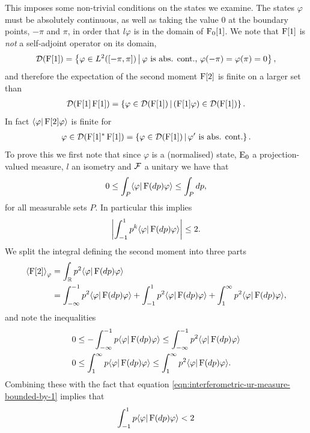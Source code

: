 This imposes some non-trivial conditions on the states we examine. The states $\varphi$ must be absolutely continuous, as well as taking the value $0$ at the boundary points, $-\pi$ and $\pi$, in order that $l\varphi$ is in the domain of $\operatorname{F}_0[1]$. We note that $\operatorname{F}[1]$ is \emph{not} a self-adjoint operator on its domain,
\begin{align}
  \mathcal{D}(\operatorname{F}[1]) = \left\{\varphi\in L^2([-\pi,\pi])\, \middle|\, \varphi \text{ is abs. cont., } \varphi(-\pi) = \varphi(\pi) = 0\right\},
\end{align}
and therefore the expectation of the second moment $\operatorname{F}[2]$ is finite on a larger set than 
\begin{align}\label{eqn:bad-opf[2]-domain}
  \mathcal{D}(\operatorname{F}[1]\operatorname{F}[1]) = \left\{\varphi\in\mathcal{D}(\operatorname{F}[1])\,\middle|\,\left(\operatorname{F}[1]\varphi\right)\in\mathcal{D}(\operatorname{F}[1])\right\}.
\end{align}
In fact $\langle \varphi|\operatorname{F}[2]\varphi\rangle$ is finite for
\begin{align}\label{eqn:good-opf[2]-domain}
  \varphi\in\mathcal{D}(\operatorname{F}[1]^*\operatorname{F}[1]) = \left\{\varphi\in\mathcal{D}(\operatorname{F}[1])\,\middle|\,\varphi^\prime \text{ is abs. cont.}\right\}.
\end{align}
To prove this we first note that since $\varphi$ is a (normalised) state, $\operatorname{E}_0$ a projection-valued measure, $l$ an isometry and $\mathcal{F}$ a unitary we have that 
\begin{align}\label{eqn:interferometric-ur-measure-bounded-by-1}
  0\leq\int_P \langle \varphi|\operatorname{F}(dp)\varphi\rangle \leq \int_P dp,
\end{align}
for all measurable sets $P$. In particular this implies
\begin{align}
   {\left\lvert{\int_{-1}^1 p^k \langle \varphi|\operatorname{F}(dp)\varphi\rangle }\right\rvert} \leq 2.
\end{align}
We split the integral defining the second moment into three parts
\begin{align}
  \left\langle{\operatorname{F}[2]}\right\rangle_{\varphi} &= \int_{\mathbb{R}} p^2 \langle \varphi|\operatorname{F}(dp)\varphi\rangle\\
                          &= \int_{-\infty}^{-1} p^2 \langle \varphi|\operatorname{F}(dp)\varphi\rangle + \int_{-1}^{1} p^2 \langle \varphi|\operatorname{F}(dp)\varphi\rangle + \int_1^{\infty} p^2 \langle \varphi|\operatorname{F}(dp)\varphi\rangle,
\end{align}
and note the inequalities
\begin{align}
  0&\leq - \int_{-\infty}^{-1} p \langle \varphi|\operatorname{F}(dp)\varphi\rangle  \leq \int_{-\infty}^{-1} p^2 \langle \varphi|\operatorname{F}(dp)\varphi\rangle\\
  0&\leq  \int_1^{\infty} p \langle \varphi|\operatorname{F}(dp)\varphi\rangle  \leq \int_1^{\infty} p^2 \langle \varphi|\operatorname{F}(dp)\varphi\rangle.
\end{align}
Combining these with the fact that equation \eqref{eqn:interferometric-ur-measure-bounded-by-1} implies that
\begin{align}
  \int_{-1}^{1} p \langle \varphi|\operatorname{F}(dp)\varphi\rangle < 2
\end{align}


